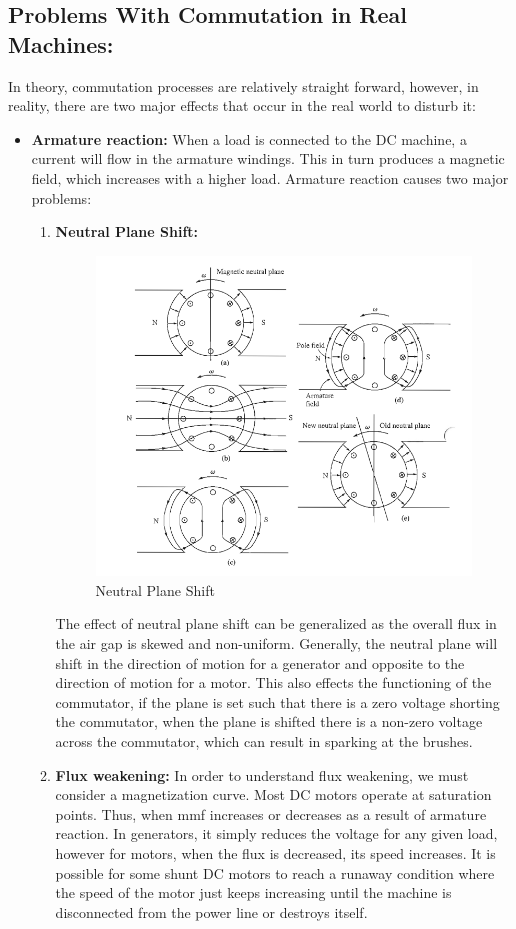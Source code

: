 \documentclass{book}
\begin{document}
\subsection{Problems With Commutation in Real Machines:}

In theory, commutation processes are relatively straight forward, however, in reality, there are two major effects that occur in the real world to disturb it:
\begin{itemize}
	\item \textbf{Armature reaction:} When a load is connected to the DC machine, a current will flow in the armature windings. This in turn produces a magnetic field, which increases with a higher load. Armature reaction causes two major problems:
	\begin{enumerate}
		\item \textbf{Neutral Plane Shift:}
		\begin{figure}[h]
			\centering
			\includegraphics[width=0.4\linewidth]{Screenshots/neutral_plane_shift}
			\caption{Neutral Plane Shift}
			\label{fig:neutralplaneshift}
		\end{figure}
		The effect of neutral plane shift can be generalized as the overall flux in the air gap is skewed and non-uniform. Generally, the neutral plane will shift in the direction of motion for a generator and opposite to the direction of motion for a motor. This also effects the functioning of the commutator, if the plane is set such that there is a zero voltage shorting the commutator, when the plane is shifted there is a non-zero voltage across the commutator, which can result in sparking at the brushes.
		\item \textbf{Flux weakening:} In order to understand flux weakening, we must consider a magnetization curve. Most DC motors operate at saturation points. Thus, when mmf increases or decreases as a result of armature reaction. In generators, it simply reduces the voltage for any given load, however for motors, when the flux is decreased, its speed increases. It is possible for some shunt DC motors to reach a runaway condition where the speed of the motor just keeps increasing until the machine is disconnected from the power line or destroys itself.

\end{enumerate}
\end{itemize}
\end{document}
